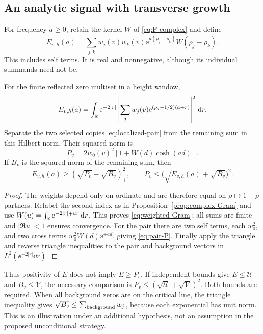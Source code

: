 \subsection{An analytic signal with transverse growth}
For frequency \(a\ge0\), retain the kernel \(W\) of
\eqref{eq:F-complex} and define
\begin{equation}\label{eq:localized-E}
 E_{v,h}(a)=\sum_{j,k}w_j(v)w_k(v)
       \ee^{a(\rho_j-\rho_k)}W(\rho_j-\rho_k).
\end{equation}
This includes self terms. It is real and nonnegative, although its
individual summands need not be.

\begin{proposition}
\label{prop:weighted-Gram}
For the finite reflected zero multiset in a height window,
\begin{equation}\label{eq:weighted-Gram}
 E_{v,h}(a)=\int_\mathbb R\mathrm e^{-2|r|}
 \left|\sum_jw_j(v)\mathrm e^{(\rho_j-1/2)(a+r)}\right|^2\,\mathrm d r.
\end{equation}
Separate the two selected copies \eqref{eq:localized-pair} from the
remaining sum in this Hilbert norm. Their squared norm is
\begin{equation}\label{eq:pair-P}
 P_v=2w_0(v)^2[1+W(d)\cosh(ad)].
\end{equation}
If \(B_v\) is the squared norm of the remaining sum, then
\begin{equation}\label{eq:background-lower}
 E_{v,h}(a)\ge(\sqrt{P_v}-\sqrt{B_v})_+^2,
 \qquad
 P_v\le\bigl(\sqrt{E_{v,h}(a)}+\sqrt{B_v}\bigr)^2.
\end{equation}
\end{proposition}
\begin{proof}
The weights depend only on ordinate and are therefore equal on
\(\rho\mapsto1-\overline\rho\) partners. Relabel the second index
as in Proposition~\ref{prop:complex-Gram} and use
\(W(u)=\int_\mathbb R\mathrm e^{-2|r|+ur}\,\mathrm d r\). This proves
\eqref{eq:weighted-Gram}; all sums are finite and
\(|\Re u|<1\) ensures convergence. For the pair there are two
self terms, each \(w_0^2\), and two cross terms
\(w_0^2 W(d)\ee^{\pm ad}\), giving \eqref{eq:pair-P}.
Finally apply the triangle and reverse triangle inequalities to the
pair and background vectors in \(L^2(\ee^{-2|r|}\dd r)\).
\end{proof}

Thus positivity of \(E\) does not imply \(E\ge P_v\).
If independent bounds give \(E\le\mathcal U\) and
\(B_v\le\mathcal V\), the necessary comparison is
\(P_v\le(\sqrt{\mathcal U}+\sqrt{\mathcal V})^2\).
Both bounds are required. When all background zeros are on the critical
line, the triangle inequality gives
\(\sqrt{B_v}\le\sum_{\rm background}w_j\), because each exponential
has unit norm. This is an illustration under an additional hypothesis,
not an assumption in the proposed unconditional strategy.

